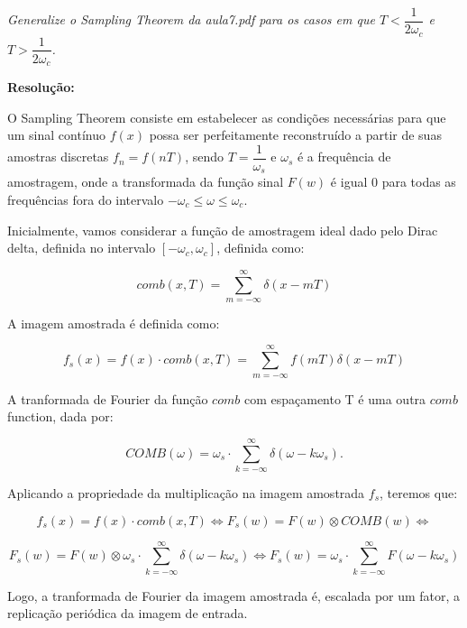 \documentclass[]{abntex2}
\begin{document}
\textit{Generalize o Sampling Theorem da aula7.pdf para os casos em que $T<\dfrac{1}{2{\omega}_c}$ e $T>\dfrac{1}{2{\omega}_c}$.}

\textbf{Resolução:}

O Sampling Theorem consiste em estabelecer as condições necessárias para que um sinal contínuo $f(x)$ possa ser perfeitamente reconstruído a partir de suas amostras discretas $f_n=f(nT)$, sendo $T=\dfrac{1}{\omega_s}$ e $\omega_s$ é a frequência de amostragem, onde a transformada da função sinal $F(w)$ é igual 0 para todas as frequências fora do intervalo $-{\omega}_c \leq \omega \leq {\omega}_c$.

Inicialmente, vamos considerar a função de amostragem ideal dado pelo Dirac delta, definida no intervalo $[-{\omega}_c,{\omega}_c]$, definida como:

\begin{equation*}
	comb(x,T) = \sum_{m=- \infty}^{\infty} \delta (x-mT)
\end{equation*}

A imagem amostrada é definida como:

\begin{equation*}
	f_s(x) = f(x) \cdot comb(x, T) = \sum_{m=- \infty}^{\infty} f(mT) \delta (x-mT)
\end{equation*}

A tranformada de Fourier da função $comb$ com espaçamento T é uma outra $comb$ function, dada por:

\begin{equation*}
	COMB(\omega) = \omega_{s} \cdot \sum_{k=- \infty}^{\infty} \delta (\omega -k\omega_{s}).
\end{equation*}

Aplicando a propriedade da multiplicação na imagem amostrada $f_s$, teremos que:

\begin{equation*}
	f_s(x) = f(x) \cdot comb(x, T)  \Leftrightarrow F_s(w) = F(w) \otimes COMB(w) \Leftrightarrow
\end{equation*}

\begin{equation*}
	F_s(w) = F(w) \otimes \omega_{s} \cdot \sum_{k=- \infty}^{\infty} \delta (\omega -k\omega_{s}) \Leftrightarrow F_s(w) = \omega_{s} \cdot \sum_{k=- \infty}^{\infty} F(\omega - k\omega_s)
\end{equation*}

Logo, a tranformada de Fourier da imagem amostrada é, escalada por um fator, a replicação periódica da imagem de entrada.
\end{document}
